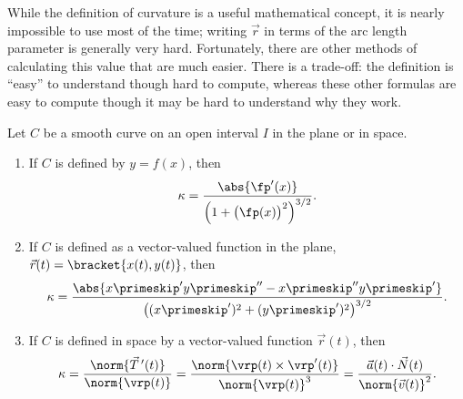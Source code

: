 While the definition of curvature is a useful mathematical concept, it is nearly impossible to use most of the time; writing $\vec r$ in terms of the arc length parameter is generally very hard. Fortunately, there are other methods of calculating this value that are much easier. There is a trade-off: the definition is ``easy\primeskip'' to understand though hard to compute, whereas these other formulas are easy to compute though it may be hard to understand why they work.

\begin{theorem}\label{thm:curvature_formulas}
Let $C$ be a smooth curve on an open interval $I$ in the plane or in space.
\begin{enumerate}
	\item If $C$ is defined by $y=f(x)$, then 
	\[\kappa = \frac{\abs{\fp'(x)}}{\Bigl(1+\bigl(\fp(x)\bigr)^2\Bigr)^{3/2}}.\]
	\item	If $C$ is defined as a vector-valued function in the plane, $\vec r(t) =\bracket{x(t), y(t)}$, then
	\[\kappa = \frac{\abs{x\primeskip'y\primeskip''-x\primeskip''y\primeskip'}}{\bigl((x\primeskip')^2+(y\primeskip')^2\bigr)^{3/2}}.\]
	\item If $C$ is defined in space by a vector-valued function $\vec r(t)$, then
\[\kappa = \frac{\norm{\vec T\,'(t)}}{\norm{\vrp(t)}} = \frac{\norm{\vrp(t)\times\vrp'(t)}}{\norm{\vrp(t)}^3} = \frac{\vec a(t)\cdot \vec N(t)}{\norm{\vec v(t)}^2}.\]
\end{enumerate}
\end{theorem}

